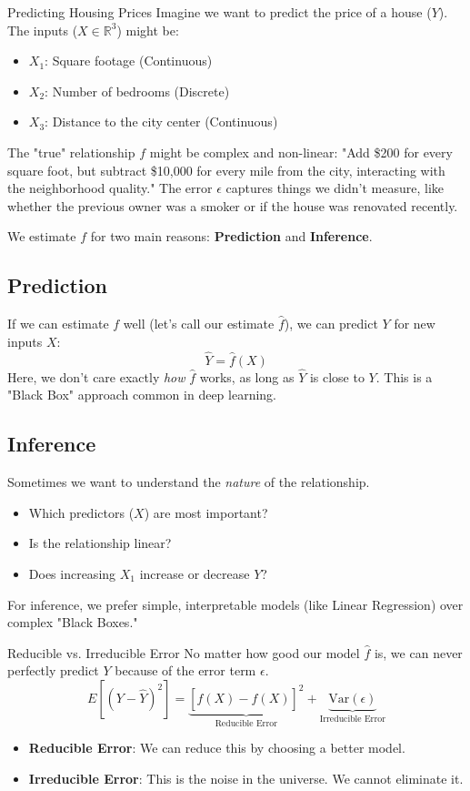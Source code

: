 \documentclass[11pt, a4paper]{article}
\begin{document}
\begin{examplebox}{Predicting Housing Prices}
Imagine we want to predict the price of a house ($Y$). The inputs ($X \in \mathbb{R}^3$) might be:
\begin{itemize}
    \item $X_1$: Square footage (Continuous)
    \item $X_2$: Number of bedrooms (Discrete)
    \item $X_3$: Distance to the city center (Continuous)
\end{itemize}

The "true" relationship $f$ might be complex and non-linear: "Add \$200 for every square foot, but subtract \$10,000 for every mile from the city, interacting with the neighborhood quality." The error $\epsilon$ captures things we didn't measure, like whether the previous owner was a smoker or if the house was renovated recently.
\end{examplebox}

We estimate $f$ for two main reasons: \textbf{Prediction} and \textbf{Inference}.

\subsection{Prediction}
If we can estimate $f$ well (let's call our estimate $\hat{f}$), we can predict $Y$ for new inputs $X$:
\[ \hat{Y} = \hat{f}(X) \]
Here, we don't care exactly \textit{how} $\hat{f}$ works, as long as $\hat{Y}$ is close to $Y$. This is a "Black Box" approach common in deep learning.

\subsection{Inference}
Sometimes we want to understand the \textit{nature} of the relationship.
\begin{itemize}
    \item Which predictors ($X$) are most important?
    \item Is the relationship linear?
    \item Does increasing $X_1$ increase or decrease $Y$?
\end{itemize}
For inference, we prefer simple, interpretable models (like Linear Regression) over complex "Black Boxes."

\begin{intuitionbox}{Reducible vs. Irreducible Error}
No matter how good our model $\hat{f}$ is, we can never perfectly predict $Y$ because of the error term $\epsilon$.
\[ E[(Y - \hat{Y})^2] = \underbrace{[f(X) - \hat{f}(X)]^2}_{\text{Reducible Error}} + \underbrace{\text{Var}(\epsilon)}_{\text{Irreducible Error}} \]
\begin{itemize}
    \item \textbf{Reducible Error}: We can reduce this by choosing a better model.
    \item \textbf{Irreducible Error}: This is the noise in the universe. We cannot eliminate it.
\end{itemize}
\end{intuitionbox}
\end{document}
